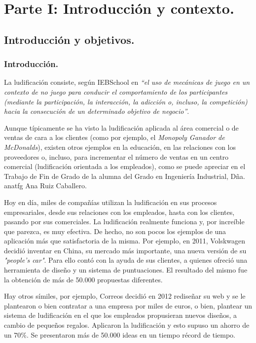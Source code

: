 \documentclass[twoside]{report}
\begin{document}
\tableofcontents

\listoffigures
 
\listoftables

\clearpage
{}
\chapter{Parte I: Introducción y contexto.}
\section{Introducción y objetivos.}

\subsection{Introducción.}

La ludificación consiste, según IEBSchool \cite{iebschoolGami} en \textit{“el uso de mecánicas de juego en un contexto de no juego para conducir el comportamiento de los participantes (mediante la participación, la interacción, la adicción o, incluso, la competición) hacia la consecución de un determinado objetivo de negocio”}. 

Aunque típicamente se ha visto la ludificación aplicada al área comercial o de ventas de cara a los clientes (como por ejemplo, el \cite{monopolymcdo} \textit{Monopoly Ganador de McDonalds}), existen otros ejemplos en la educación, en las relaciones con los proveedores o, incluso, para incrementar el número de ventas en un centro comercial (ludificación orientada a los empleados), como se puede apreciar en el Trabajo de Fin de Grado de la alumna del Grado en Ingeniería Industrial, Dña. {anatfg} Ana Ruiz Caballero.

Hoy en día, miles de compañías utilizan la ludificación en sus procesos empresariales, desde sus relaciones con los empleados, hasta con los clientes, pasando por sus comerciales. La ludificación realmente funciona y, por increíble que parezca, es muy efectiva. De hecho, no son pocos los ejemplos de una aplicación más que satisfactoria de la misma. Por ejemplo, en 2011, \cite{accentureGami} Volskwagen decidió inventar en China, su mercado más importante, una nueva versión de su \textit{"people’s car"}. Para ello contó con la ayuda de sus clientes, a quienes ofreció una herramienta de diseño y un sistema de puntuaciones. El resultado del mismo fue la obtención de más de 50.000 propuestas diferentes.

Hay otros símiles, por ejemplo, Correos decidió en 2012 rediseñar su web y se le plantearon o bien contratar a una empresa por miles de euros, o bien, plantear un sistema de ludificación en el que los empleados propusieran nuevos diseños, a cambio de pequeños regalos. Aplicaron la ludificación y esto supuso un ahorro de un 70\%. Se presentaron más de 50.000 ideas en un tiempo récord de tiempo.
\end{document}
